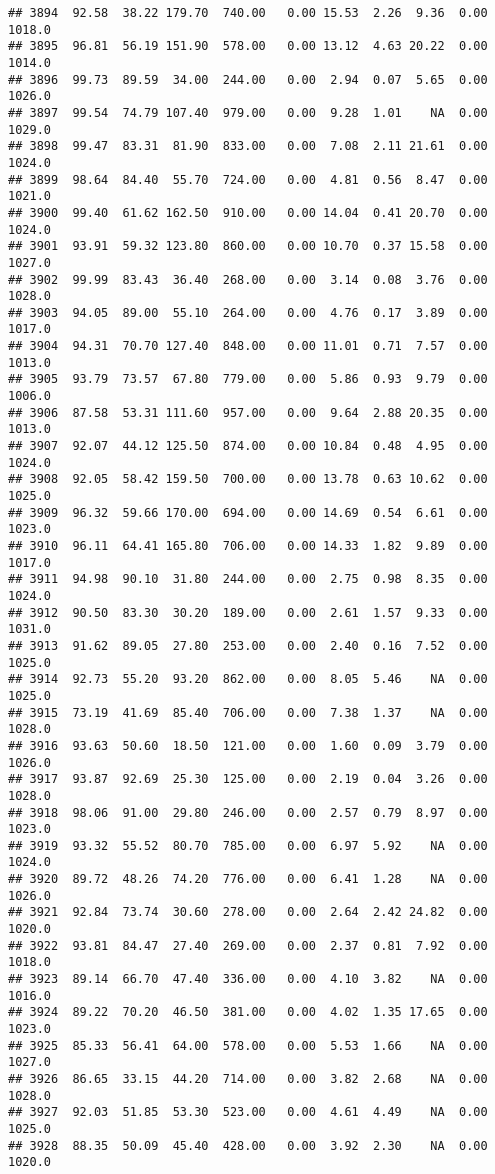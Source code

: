 \documentclass{article}\usepackage{graphicx, color}
\makeatletter
\newenvironment{kframe}{%
 \def\at@end@of@kframe{}%
 \ifinner\ifhmode%
  \def\at@end@of@kframe{\end{minipage}}%
  \begin{minipage}{\columnwidth}%
 \fi\fi%
 \def\FrameCommand##1{\hskip\@totalleftmargin \hskip-\fboxsep
 \colorbox{shadecolor}{##1}\hskip-\fboxsep
     \hskip-\linewidth \hskip-\@totalleftmargin \hskip\columnwidth}%
 \MakeFramed {\advance\hsize-\width
   \@totalleftmargin\z@ \linewidth\hsize
   \@setminipage}}%
 {\par\unskip\endMakeFramed%
 \at@end@of@kframe}
\newenvironment{knitrout}{}{} %
\makeatother
\begin{document}
\begin{knitrout}
\begin{kframe}
\begin{verbatim}
## 3894  92.58  38.22 179.70  740.00   0.00 15.53  2.26  9.36  0.00 1018.0
## 3895  96.81  56.19 151.90  578.00   0.00 13.12  4.63 20.22  0.00 1014.0
## 3896  99.73  89.59  34.00  244.00   0.00  2.94  0.07  5.65  0.00 1026.0
## 3897  99.54  74.79 107.40  979.00   0.00  9.28  1.01    NA  0.00 1029.0
## 3898  99.47  83.31  81.90  833.00   0.00  7.08  2.11 21.61  0.00 1024.0
## 3899  98.64  84.40  55.70  724.00   0.00  4.81  0.56  8.47  0.00 1021.0
## 3900  99.40  61.62 162.50  910.00   0.00 14.04  0.41 20.70  0.00 1024.0
## 3901  93.91  59.32 123.80  860.00   0.00 10.70  0.37 15.58  0.00 1027.0
## 3902  99.99  83.43  36.40  268.00   0.00  3.14  0.08  3.76  0.00 1028.0
## 3903  94.05  89.00  55.10  264.00   0.00  4.76  0.17  3.89  0.00 1017.0
## 3904  94.31  70.70 127.40  848.00   0.00 11.01  0.71  7.57  0.00 1013.0
## 3905  93.79  73.57  67.80  779.00   0.00  5.86  0.93  9.79  0.00 1006.0
## 3906  87.58  53.31 111.60  957.00   0.00  9.64  2.88 20.35  0.00 1013.0
## 3907  92.07  44.12 125.50  874.00   0.00 10.84  0.48  4.95  0.00 1024.0
## 3908  92.05  58.42 159.50  700.00   0.00 13.78  0.63 10.62  0.00 1025.0
## 3909  96.32  59.66 170.00  694.00   0.00 14.69  0.54  6.61  0.00 1023.0
## 3910  96.11  64.41 165.80  706.00   0.00 14.33  1.82  9.89  0.00 1017.0
## 3911  94.98  90.10  31.80  244.00   0.00  2.75  0.98  8.35  0.00 1024.0
## 3912  90.50  83.30  30.20  189.00   0.00  2.61  1.57  9.33  0.00 1031.0
## 3913  91.62  89.05  27.80  253.00   0.00  2.40  0.16  7.52  0.00 1025.0
## 3914  92.73  55.20  93.20  862.00   0.00  8.05  5.46    NA  0.00 1025.0
## 3915  73.19  41.69  85.40  706.00   0.00  7.38  1.37    NA  0.00 1028.0
## 3916  93.63  50.60  18.50  121.00   0.00  1.60  0.09  3.79  0.00 1026.0
## 3917  93.87  92.69  25.30  125.00   0.00  2.19  0.04  3.26  0.00 1028.0
## 3918  98.06  91.00  29.80  246.00   0.00  2.57  0.79  8.97  0.00 1023.0
## 3919  93.32  55.52  80.70  785.00   0.00  6.97  5.92    NA  0.00 1024.0
## 3920  89.72  48.26  74.20  776.00   0.00  6.41  1.28    NA  0.00 1026.0
## 3921  92.84  73.74  30.60  278.00   0.00  2.64  2.42 24.82  0.00 1020.0
## 3922  93.81  84.47  27.40  269.00   0.00  2.37  0.81  7.92  0.00 1018.0
## 3923  89.14  66.70  47.40  336.00   0.00  4.10  3.82    NA  0.00 1016.0
## 3924  89.22  70.20  46.50  381.00   0.00  4.02  1.35 17.65  0.00 1023.0
## 3925  85.33  56.41  64.00  578.00   0.00  5.53  1.66    NA  0.00 1027.0
## 3926  86.65  33.15  44.20  714.00   0.00  3.82  2.68    NA  0.00 1028.0
## 3927  92.03  51.85  53.30  523.00   0.00  4.61  4.49    NA  0.00 1025.0
## 3928  88.35  50.09  45.40  428.00   0.00  3.92  2.30    NA  0.00 1020.0

\end{verbatim}
\end{kframe}
\end{knitrout}
\end{document}
